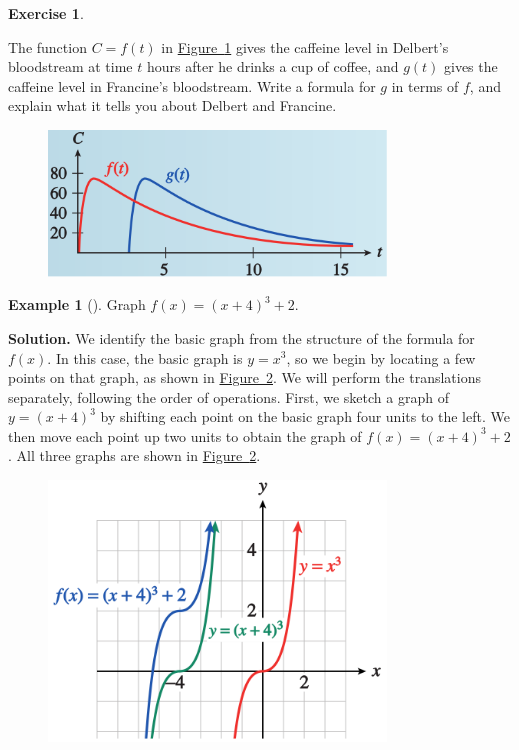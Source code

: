 \documentclass[10pt,]{book}
\theoremstyle{plain}
\theoremstyle{definition}
\newtheorem{exercise}[theorem]{Exercise}
\theoremstyle{definition}
\newtheorem{example}[theorem]{Example}
\numberwithin{equation}{section}
\begin{document}
\begin{exercise}\label{exercise-shift-surge-curve}

    The function \(C = f (t)\) in \hyperref[fig-shift-surge-curve]{Figure~\ref{fig-shift-surge-curve}} gives the caffeine level in Delbert's bloodstream at time \(t\) hours after he drinks a cup of coffee, and \(g(t)\) gives the caffeine level in Francine's bloodstream. Write a formula for \(g\) in terms of \(f\), and explain what it tells you about Delbert and Francine.
    \leavevmode%
\begin{figure}
\centering
\includegraphics[width=0.80\textwidth,]{images/fig-shift-surge-curve.svg}\caption{\label{fig-shift-surge-curve}}
\end{figure}
\end{exercise}
\begin{example}[]\label{example-translate-cubic}
Graph \(f (x) = (x + 4)^3 + 2\).%
\par\medskip\noindent%
\textbf{Solution.}\quad 
            We identify the basic graph from the structure of the formula for \(f (x)\). In this case, the basic graph is \(y = x^3\), so we begin by locating a few points on that graph, as shown in \hyperref[fig-translate-cubic]{Figure~\ref{fig-translate-cubic}}. We will perform the translations separately, following the order of operations. First, we sketch a graph of \(y = (x + 4)^3\) by shifting each point on the basic graph four units to the left. We then move each point up two units to obtain the graph of \(f (x) = (x + 4)^3 + 2\). All three graphs are shown in \hyperref[fig-translate-cubic]{Figure~\ref{fig-translate-cubic}}.
\leavevmode%
\begin{figure}
\centering
\includegraphics[width=0.80\textwidth,]{images/fig-translate-cubic.svg}\caption{\label{fig-translate-cubic}}
\end{figure}
\end{example}
\end{document}
